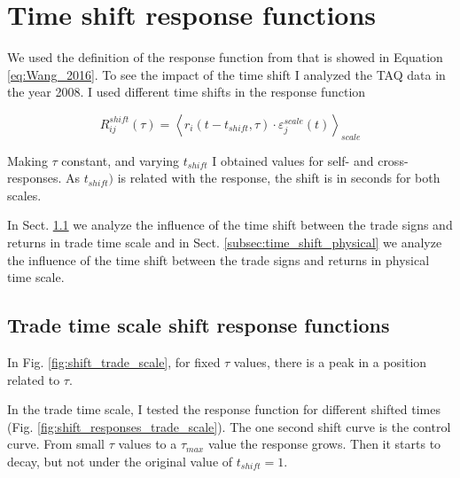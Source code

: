 \section{Time shift response functions}\label{sec:time_shift}

We used the definition of the response function from \cite{Wang_2016_cross} that
is showed in Equation \ref{eq:Wang_2016}. To see the impact of the time shift I
analyzed the TAQ data in the year 2008. I used different time shifts in the
response function

\begin{equation}\label{eq:time_shift_general}
    R_{ij}^{shift}\left(\tau\right)=\left\langle r_{i}
    \left(t-t_{shift},\tau\right) \cdot\varepsilon^{scale}_{j}
    \left(t\right)\right\rangle _{scale}
\end{equation}

Making $\tau$ constant, and varying $t_{shift}$ I obtained values for self- and
cross-responses. As $t_{shift})$ is related with the response, the shift is in
seconds for both scales.

In Sect. \ref{subsec:time_shift_trade} we analyze the influence of the time
shift between the trade signs and returns in trade time scale and in Sect.
\ref{subsec:time_shift_physical} we analyze the influence of the time shift
between the trade signs and returns in physical time scale.

\subsection{Trade time scale shift response functions}
\label{subsec:time_shift_trade}

In Fig. \ref{fig:shift_trade_scale}, for fixed $\tau$ values, there is a peak
in a position related to $\tau$.

In the trade time scale, I tested the response function for different shifted
times (Fig. \ref{fig:shift_responses_trade_scale}). The one second shift curve
is the control curve. From small $\tau$ values to a $\tau_{max}$ value the
response grows. Then it starts to decay, but not under the original value of
$t_{shift} = 1$.

